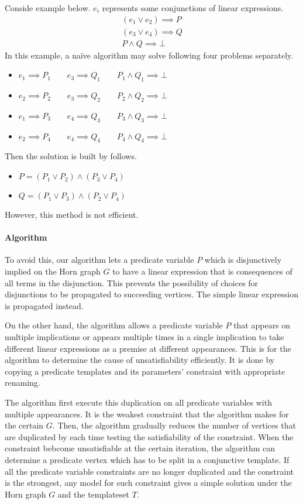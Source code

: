 \documentclass[master,final,12pt]{iscs-thesis}
\begin{document}
Conside example below. $e_i$ represents some conjunctions of linear
expressions.
\begin{align*}
(e_1 \vee e_2) \implies P \\ (e_3 \vee e_4) \implies Q \\ P \wedge Q \implies \bot
\end{align*}
In this example, a na\"{i}ve algorithm may solve following four
problems separately.
\begin{itemize}
\item $e_1 \implies P_1 \qquad e_3 \implies Q_1 \qquad P_1 \wedge Q_1 \implies \bot$
\item $e_2 \implies P_2 \qquad e_3 \implies Q_2 \qquad P_2 \wedge Q_2 \implies \bot$
\item $e_1 \implies P_3 \qquad e_4 \implies Q_3 \qquad P_3 \wedge Q_3 \implies \bot$
\item $e_2 \implies P_4 \qquad e_4 \implies Q_4 \qquad P_4 \wedge Q_4 \implies \bot$
\end{itemize}
Then the solution is built by follows.
\begin{itemize}
\item $P = ( P_1 \vee P_2 ) \wedge ( P_3 \vee P_4 )$
\item $Q = ( P_1 \vee P_3 ) \wedge ( P_2 \vee P_4 )$
\end{itemize}
However, this method is not efficient.

\paragraph{Algorithm}
To avoid this, our algorithm lets a predicate variable $P$ which is
disjunctively implied on the Horn graph $G$ to have a linear
expression that is consequences of all terms in the disjunction.  This
prevents the possibility of choices for disjunctions to be propagated
to succeeding vertices. The simple linear expression is propagated
instead.

On the other hand, the algorithm allows a predicate variable $P$ that
appears on multiple implications or appears multiple times in a single
implication to take different linear expressions as a premise at
different appearances.  This is for the algorithm to determine the
cause of unsatisfiability efficiently.  It is done by copying a
predicate templates and its parameters' constraint with appropriate
renaming.

The algorithm first execute this duplication on all predicate
variables with multiple appearances.  It is the weakest constraint
that the algorithm makes for the certain $G$.  Then, the algorithm
gradually reduces the number of vertices that are duplicated by each
time testing the satisfiability of the constraint.  When the
constraint bebcome unsatisfiable at the certain iteration, the
algorithm can determine a predicate vertex which has to be split in a
conjunctive template.  If all the predicate variable constraints are
no longer duplicated and the constraint is the strongest, any model
for such constraint gives a simple solution under the Horn graph $G$
and the templateset $T$.
\end{document}

